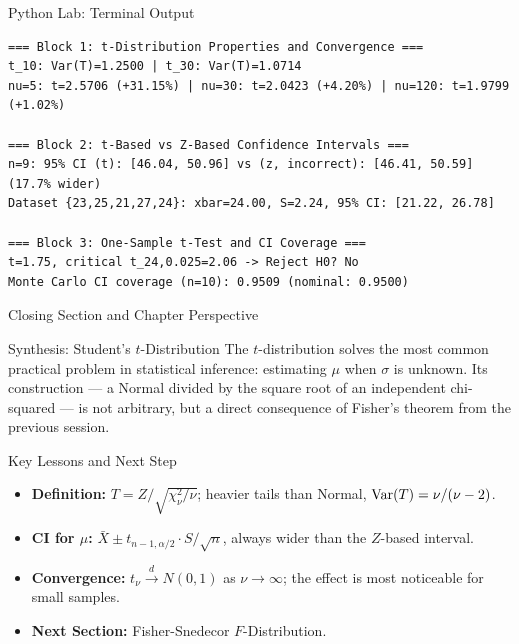 \documentclass[aspectratio=169,xcolor={dvipsnames,table}]{beamer}
\begin{document}
\begin{frame}[fragile]{Python Lab: Terminal Output}
	\vspace{-0.1cm}
	\begin{block}{}
		\fontsize{4pt}{5pt}\selectfont
		\begin{verbatim}
=== Block 1: t-Distribution Properties and Convergence ===
t_10: Var(T)=1.2500 | t_30: Var(T)=1.0714
nu=5: t=2.5706 (+31.15%) | nu=30: t=2.0423 (+4.20%) | nu=120: t=1.9799 (+1.02%)

=== Block 2: t-Based vs Z-Based Confidence Intervals ===
n=9: 95% CI (t): [46.04, 50.96] vs (z, incorrect): [46.41, 50.59] (17.7% wider)
Dataset {23,25,21,27,24}: xbar=24.00, S=2.24, 95% CI: [21.22, 26.78]

=== Block 3: One-Sample t-Test and CI Coverage ===
t=1.75, critical t_24,0.025=2.06 -> Reject H0? No
Monte Carlo CI coverage (n=10): 0.9509 (nominal: 0.9500)
		\end{verbatim}
	\end{block}
\end{frame}


\begin{frame}{Closing Section and Chapter Perspective}
	\vspace{-0.2cm}
	\begin{block}{Synthesis: Student's $t$-Distribution}
		\scriptsize
		The $t$-distribution solves the most common practical problem in statistical inference: estimating $\mu$ when $\sigma$ is unknown. Its construction --- a Normal divided by the square root of an independent chi-squared --- is not arbitrary, but a direct consequence of Fisher's theorem from the previous session.
	\end{block}
	\vspace{0.05cm}
	\pause
	\begin{alertblock}{Key Lessons and Next Step}
		\begin{itemize}\itemsep=0.05cm
			\item \textbf{Definition:} $T=Z/\sqrt{\chi^2_\nu/\nu}$; heavier tails than Normal, $\operatorname{Var}(T)=\nu/(\nu-2)$.
			\item \textbf{CI for $\mu$:} $\bar X \pm t_{n-1,\alpha/2}\cdot S/\sqrt n$, always wider than the $Z$-based interval.
			\item \textbf{Convergence:} $t_\nu \xrightarrow{d} N(0,1)$ as $\nu\to\infty$; the effect is most noticeable for small samples.
			\item \textbf{Next Section:} \textcolor{TecRojo}{Fisher-Snedecor $F$-Distribution}.
		\end{itemize}
	\end{alertblock}
\end{frame}
\end{document}
